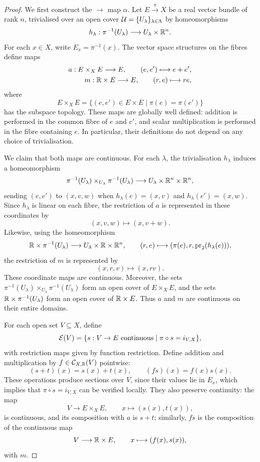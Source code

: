 \documentclass[12pt,a4paper]{article}
\begin{document}
\begin{proof}

We first construct the $\rightarrow$ map $\alpha$. Let $E \overset{\pi}\to X$ be a real vector bundle of rank $n$, trivialised over an open cover
$\mathcal{U} = \{U_\lambda\}_{\lambda \in \Lambda}$ by homeomorphisms
\[
    h_\lambda:\pi^{-1}(U_\lambda) \longrightarrow U_\lambda \times \mathbb{R}^n.
\]
For each $x \in X$, write $E_x = \pi^{-1}(x)$. The vector space structures on the fibres define maps
\begin{align}
    a:E \times_X E \longrightarrow E,
    \qquad (e,e') \longmapsto e+e',\\
    m:\mathbb{R} \times E \longrightarrow E,
    \qquad (r,e) \longmapsto re,
\end{align}
where
\[
    E \times_X E
    = \{(e,e') \in E \times E \mid \pi(e)=\pi(e')\}
\]
has the subspace topology. These maps are globally well defined:
addition is performed in the common fibre of $e$ and $e'$, and scalar
multiplication is performed in the fibre containing $e$. In particular,
their definitions do not depend on any choice of trivialisation.

We claim that both maps are continuous. For each $\lambda$, the trivialisation $h_\lambda$ induces a homeomorphism
\[
    \pi^{-1}(U_\lambda) \times_{U_\lambda} \pi^{-1}(U_\lambda)
    \longrightarrow U_\lambda \times \mathbb{R}^n \times \mathbb{R}^n,
\]
sending $(e,e')$ to $(x,v,w)$ when
$h_\lambda(e)=(x,v)$ and $h_\lambda(e')=(x,w)$.
Since $h_\lambda$ is linear on each fibre, the restriction of $a$
is represented in these coordinates by
\[
    (x,v,w) \longmapsto (x,v+w).
\]
Likewise, using the homeomorphism
\[
    \mathbb{R} \times \pi^{-1}(U_\lambda)
    \longrightarrow U_\lambda \times \mathbb{R} \times \mathbb{R}^n,
    \qquad
    (r,e) \longmapsto (\pi(e),r,\operatorname{pr}_2(h_\lambda(e))),
\]
the restriction of $m$ is represented by
\[
    (x,r,v) \longmapsto (x,rv).
\]
These coordinate maps are continuous. Moreover, the sets
$\pi^{-1}(U_\lambda) \times_{U_\lambda} \pi^{-1}(U_\lambda)$
form an open cover of $E \times_X E$, and the sets
$\mathbb{R} \times \pi^{-1}(U_\lambda)$ form an open cover of $\mathbb{R} \times E$.
Thus $a$ and $m$ are continuous on their entire domains.

For each open set $V \subseteq X$, define
\[
    \mathcal{E}(V)
    =
    \{s:V \to E \text{ continuous} \mid \pi \circ s = i_{V,X}\},
\]
with restriction maps given by function restriction. Define addition
and multiplication by $f \in \mathcal{C}_{X,\mathbb{R}}(V)$ pointwise:
\[
    (s+t)(x)=s(x)+t(x),
    \qquad
    (fs)(x)=f(x)s(x).
\]
These operations produce sections over $V$, since their values lie in $E_x$, which implies that $\pi \circ s=i_{V,X}$ can be verified locally. They also preserve continuity: the map
\[
    V \longrightarrow E \times_X E,
    \qquad x \longmapsto (s(x),t(x)),
\]
is continuous, and its composition with $a$ is $s+t$; similarly,
$fs$ is the composition of the continuous map
\[
    V \longrightarrow \mathbb{R} \times E,
    \qquad x \longmapsto (f(x),s(x)),
\]
with $m$.


\end{proof}
\end{document}
